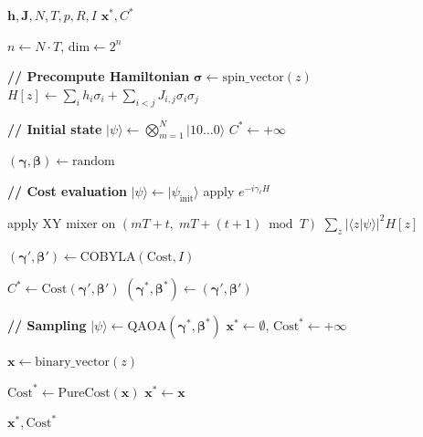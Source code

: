 \begin{algorithm}[!htbp]
\footnotesize
\setlength{\baselineskip}{9pt}
\caption{QAOA with XY Mixer for Scheduling}
\label{alg:qaoa_xy}
\begin{algorithmic}[1]

\Require $\mathbf{h}, \mathbf{J}, N, T, p, R, I$
\Ensure $\mathbf{x}^*, C^*$

\State $n \gets N \cdot T$, \quad $\text{dim} \gets 2^n$

\Statex \textbf{// Precompute Hamiltonian}
    \State $\boldsymbol{\sigma} \gets \text{spin\_vector}(z)$
    \State $H[z] \gets \sum_i h_i \sigma_i + \sum_{i<j} J_{i,j} \sigma_i \sigma_j$
\EndFor

\Statex \textbf{// Initial state}
\State $\lvert \psi \rangle \gets \bigotimes_{m=1}^{N} \lvert 10\ldots 0 \rangle$
\State $C^* \gets +\infty$


\State $(\boldsymbol{\gamma}, \boldsymbol{\beta}) \gets \text{random}$

\Statex \textbf{// Cost evaluation}
    \State $\lvert \psi \rangle \gets \lvert \psi_{\text{init}} \rangle$
        \State apply $e^{-i \gamma_\ell H}$

                \State apply XY mixer on $(mT+t,\; mT+(t+1)\bmod T)$
            \EndFor
        \EndFor
    \EndFor
    \State \Return $\sum_z |\langle z|\psi\rangle|^2 H[z]$
\EndFunction

\State $(\boldsymbol{\gamma}', \boldsymbol{\beta}') \gets \text{COBYLA}(\text{Cost}, I)$

    \State $C^* \gets \text{Cost}(\boldsymbol{\gamma}', \boldsymbol{\beta}')$
    \State $(\boldsymbol{\gamma}^*, \boldsymbol{\beta}^*) \gets (\boldsymbol{\gamma}', \boldsymbol{\beta}')$
\EndIf

\EndFor

\Statex \textbf{// Sampling}
\State $\lvert \psi \rangle \gets \text{QAOA}(\boldsymbol{\gamma}^*, \boldsymbol{\beta}^*)$
\State $\mathbf{x}^* \gets \emptyset$, \quad $\text{Cost}^* \gets +\infty$

    \State $\mathbf{x} \gets \text{binary\_vector}(z)$

            \State $\text{Cost}^* \gets \text{PureCost}(\mathbf{x})$
            \State $\mathbf{x}^* \gets \mathbf{x}$
        \EndIf
    \EndIf
\EndFor

\State \Return $\mathbf{x}^*, \text{Cost}^*$

\end{algorithmic}
\end{algorithm}

